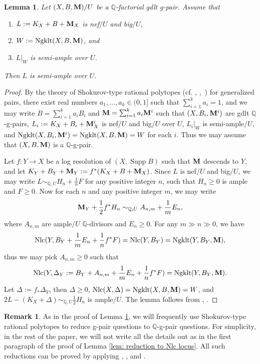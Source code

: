 \documentclass[11pt]{amsart}
\numberwithin{equation}{section}
\newcommand{\Mm}{{\bf{M}}}
\newcommand{\Qq}{\mathbb{Q}}
\newcommand{\Supp}{\operatorname{Supp}}
\newcommand{\Ngklt}{\operatorname{Ngklt}}
\newcommand{\Nlc}{\operatorname{Nlc}}
\newtheorem{lem}[thm]{Lemma}
\theoremstyle{definition}
\theoremstyle{definition}
\newtheorem{rem}[thm]{Remark}
\theoremstyle{definition}
\begin{document}
\begin{lem}\label{lem: reduction to Nlc locus}
  Let $(X,B,\Mm)/U$ be a $\Qq$-factorial gdlt g-pair. Assume that
  \begin{enumerate}
    \item $L:=K_X+B+\Mm_X$ is nef$/U$ and big$/U$,
    \item $W:=\Ngklt(X,B,\Mm)$, and
    \item $L|_W$ is semi-ample over $U$.
  \end{enumerate}
  Then $L$ is semi-ample over $U$.
\end{lem}
\begin{proof}
  By the theory of Shokurov-type rational polytopes (cf.
    \cite[Proposition 3.16]{HL22}, \cite[Lemma
  5.3]{HLS19},~\cite[Theorem 1.4]{Che20}) for generalized pairs,
  there exist real numbers $a_1,\dots,a_k\in (0,1]$ such that
  $\sum_{i=1}^ka_i=1$, and we may write $B=\sum_{i=1}^ka_iB_i$ and
  $\Mm=\sum_{i=1}^ka_i\Mm^i$ such that $(X,B_i,\Mm^i)$ are gdlt
  $\mathbb Q$-g-pairs, $L_i:=K_X+B_i+\Mm^i_X$ is nef$/U$ and big$/U$
  over $U$, $L_i|_W$ is semi-ample$/U$, and
  $\Ngklt(X,B_i,\Mm^i)=\Ngklt(X,B,\Mm)=W$ for each $i$. Thus we may
  assume that $(X,B,\Mm)$ is a $\mathbb Q$-g-pair.

  Let $f:Y\to X$ be a log resolution of $(X,\Supp B)$ such that $\Mm$
  descends to $Y$, and let $K_Y+B_Y+\Mm_Y:=f^*(K_X+B+\Mm_X)$. Since
  $L$ is nef$/U$ and big$/U$, we may write $L\sim_{\mathbb
  Q,U}H_n+\frac{1}{n}F$ for any positive integer $n$, such that
  $H_n\geq 0$ is ample and $F\geq 0$. Now for each $n$ and any
  positive integer $m$, we may write
  $$\Mm_Y+\frac{1}{2}f^*H_n\sim_{\mathbb Q,U}A_{n,m}+\frac{1}{m}E_{n},$$
  where $A_{n,m}$ are ample$/U$ $\mathbb Q$-divisors and $E_n\geq 0$.
  For any $m\gg n\gg 0$, we have
  $$\Nlc(Y,B_Y+\frac{1}{m}E_n+\frac{1}{n}f^*F)=\Nlc(Y,B_Y)=\Ngklt(Y,B_Y,\Mm),$$
  thus we may pick $A_{n,m}\geq 0$ such that
  $$\Nlc(Y,\Delta_Y:=B_Y+A_{n,m}+\frac{1}{m}E_n+\frac{1}{n}f^*F)=\Ngklt(Y,B_Y,\Mm).$$
  Let $\Delta:=f_*\Delta_Y$, then $\Delta\geq 0$,
  $\Nlc(X,\Delta)=\Ngklt(X,B,\Mm)=W$, and
  $2L-(K_X+\Delta)\sim_{\mathbb Q,U}\frac{1}{2}H_n$ is ample$/U$. The
  lemma follows from \cite[Theorems 4.5.5, 6.5.1]{Fuj17},
  \cite[Theroem 5.3]{Amb03}.
\end{proof}

\begin{rem}\label{rem: to q coefficients}
  As in the proof of Lemma \ref{lem: reduction to Nlc locus}, we will
  frequently use Shokurov-type rational polytopes to reduce g-pair
  questions to $\mathbb Q$-g-pair questions. For simplicity, in the
  rest of the paper, we will not write all the details out as in the
  first paragraph of the proof of Lemma \ref{lem: reduction to Nlc
  locus}. All such reductions can be proved by applying
  \cite[Proposition 3.16]{HL22}, \cite[Lemma 5.3]{HLS19}, and
  \cite[Theorem 1.4]{Che20}.
\end{rem}
\end{document}
